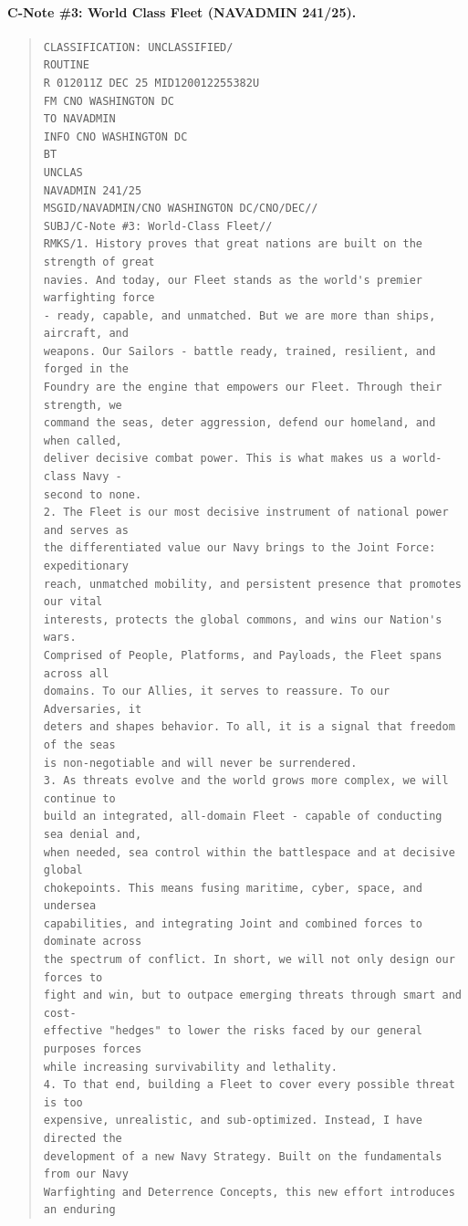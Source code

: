 \documentclass[../main.tex]{subfiles}
\begin{document}
\paragraph{C-Note \#3: World Class Fleet (NAVADMIN 241/25).}
\begin{quote}\small\begin{verbatim}
CLASSIFICATION: UNCLASSIFIED/
ROUTINE
R 012011Z DEC 25 MID120012255382U
FM CNO WASHINGTON DC
TO NAVADMIN
INFO CNO WASHINGTON DC
BT
UNCLAS
NAVADMIN 241/25
MSGID/NAVADMIN/CNO WASHINGTON DC/CNO/DEC//
SUBJ/C-Note #3: World-Class Fleet//
RMKS/1. History proves that great nations are built on the strength of great
navies. And today, our Fleet stands as the world's premier warfighting force
- ready, capable, and unmatched. But we are more than ships, aircraft, and
weapons. Our Sailors - battle ready, trained, resilient, and forged in the
Foundry are the engine that empowers our Fleet. Through their strength, we
command the seas, deter aggression, defend our homeland, and when called,
deliver decisive combat power. This is what makes us a world-class Navy -
second to none.
2. The Fleet is our most decisive instrument of national power and serves as
the differentiated value our Navy brings to the Joint Force: expeditionary
reach, unmatched mobility, and persistent presence that promotes our vital
interests, protects the global commons, and wins our Nation's wars.
Comprised of People, Platforms, and Payloads, the Fleet spans across all
domains. To our Allies, it serves to reassure. To our Adversaries, it
deters and shapes behavior. To all, it is a signal that freedom of the seas
is non-negotiable and will never be surrendered.
3. As threats evolve and the world grows more complex, we will continue to
build an integrated, all-domain Fleet - capable of conducting sea denial and,
when needed, sea control within the battlespace and at decisive global
chokepoints. This means fusing maritime, cyber, space, and undersea
capabilities, and integrating Joint and combined forces to dominate across
the spectrum of conflict. In short, we will not only design our forces to
fight and win, but to outpace emerging threats through smart and cost-
effective "hedges" to lower the risks faced by our general purposes forces
while increasing survivability and lethality.
4. To that end, building a Fleet to cover every possible threat is too
expensive, unrealistic, and sub-optimized. Instead, I have directed the
development of a new Navy Strategy. Built on the fundamentals from our Navy
Warfighting and Deterrence Concepts, this new effort introduces an enduring

\end{verbatim}
\end{quote}
\end{document}
